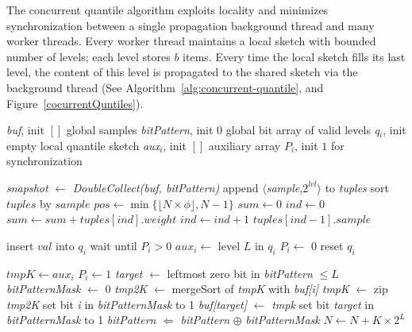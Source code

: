 The concurrent quantile algorithm exploits locality and minimizes
synchronization between a single propagation
background thread and many worker threads.
Every worker thread maintains a local sketch with bounded number
of levels; each level stores $b$ items. 
Every time the local sketch fills its last level, 
the content of this  level is propagated to the
shared sketch via the background thread (See Algorithm~\ref{alg:concurrent-quantile}, and Figure~\ref{cocurrentQuntiles}).

\begin{algorithm*}[tb]
\small
\begin{multicols}{2}
\begin{algorithmic}[1]

\Vars
\State \emph{buf}, init $[ ]$ \Comment global samples
\State \emph{bitPattern}, init 0 \Comment global bit array of valid levels
\Statex
{}
	\State \emph{q$_i$}, init empty \Comment local quantile sketch
	\State \emph{aux$_i$}, init $[ ]$ \Comment auxiliary array
	 $P_i$, init $1$ \Comment for synchronization
\EndFor
\EndFor

\Statex
{}
\State \emph{snapshot} $\leftarrow$ \emph{DoubleCollect(buf, bitPattern)}
 \label{l:caught-snapshot}
		\State append $\langle$\emph{sample},\emph{$2^{lvl}$}$\rangle$ to \emph{tuples}
	\EndFor
\EndFor
\State sort $tuples$ by $sample$
\State $pos \leftarrow \min {\{\lfloor N \times \phi \rfloor, N-1\}}$
\State $sum \leftarrow 0$
\State $ind \leftarrow 0$
	\State $sum \leftarrow sum + tuples[ind].weight$
	\State $ind \leftarrow ind + 1$
\EndWhile
\State \Return $tuples[ind-1].sample$ 
\EndProcedure

\State insert $val$ into $q_i$
		\State wait until $P_i>0$
		\State $aux_i \leftarrow$ level $L$ in $q_i$
		\State $P_i \leftarrow$ 0
		\State reset $q_i$
\EndIf
\EndProcedure

		\State $tmpK \leftarrow aux_i$
		\State $P_i \leftarrow 1$
		\State \emph{target} $\leftarrow$ leftmost zero bit in \emph{bitPattern} $\leq L$
		\State \emph{bitPatternMask} $\leftarrow$ 0
				\State \emph{tmp2K} $\leftarrow$ mergeSort of \emph{tmpK} with \emph{buf[i]}
				\State \emph{tmpK} $\leftarrow$ zip \emph{tmp2K} \label{l:zip}
				\State set bit \emph{i} in \emph{bitPatternMask} to 1
		\EndFor
		\State \emph{buf[target]} $\leftarrow$ \emph{tmpk}
		\State set bit \emph{target} in \emph{bitPatternMask} to 1
		\State \emph{bitPattern} $\Leftarrow$ \emph{bitPattern} $\oplus$ \emph{bitPatternMask}
		\State $N \leftarrow N + K \times 2^{L}$
\EndFor
\EndWhile
\EndProcedure


\end{algorithmic}
\end{multicols}
\end{algorithm*}
